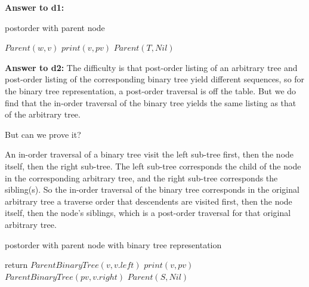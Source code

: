 \documentclass[a4paper,11pt]{article}
\theoremstyle{mytheor}
\begin{document}
\vspace{1.2in}

\noindent\textbf{Answer to d1:}
\begin{algorithm}[H]
\caption{postorder with parent node}\label{sec:TREEEVALUATION_2_19_D1}
\begin{algorithmic}[1]
    \State $Parent(w, v)$
  \EndFor
  $print(v, pv)$
\EndProcedure
\State
{}
  \State $Parent(T, Nil)$
\EndProcedure
\end{algorithmic}
\end{algorithm}

\vspace{1.2in}

\noindent\textbf{Answer to d2:} The difficulty is that post-order listing of an arbitrary tree and post-order listing of the corresponding binary tree yield different sequences, so for the binary tree representation, a post-order traversal is off the table. But we do find that the in-order traversal of the binary tree yields the same listing as that of the arbitrary tree.

But can we prove it?

An in-order traversal of a binary tree visit the left sub-tree first, then the node itself, then the right sub-tree. The left sub-tree corresponds the child of the node in the corresponding arbitrary tree, and the right sub-tree corresponds the sibling(s). So the in-order traversal of the binary tree corresponds in the original arbitrary tree a traverse order that descendents are visited first, then the node itself, then the node's siblings, which is a post-order traversal for that original arbitrary tree.

\begin{algorithm}[H]
\caption{postorder with parent node with binary tree representation}\label{sec:TREEEVALUATION_2_19_D2}
\begin{algorithmic}[1]
    \State return
  \Else
    \State $ParentBinaryTree(v, v.left)$ 
    \State $print(v, pv)$
    \State $ParentBinaryTree(pv, v.right)$ 
  \EndIf
\EndProcedure
\State
{}
  \State $Parent(S, Nil)$
\EndProcedure
\end{algorithmic}
\end{algorithm}
\end{document}
